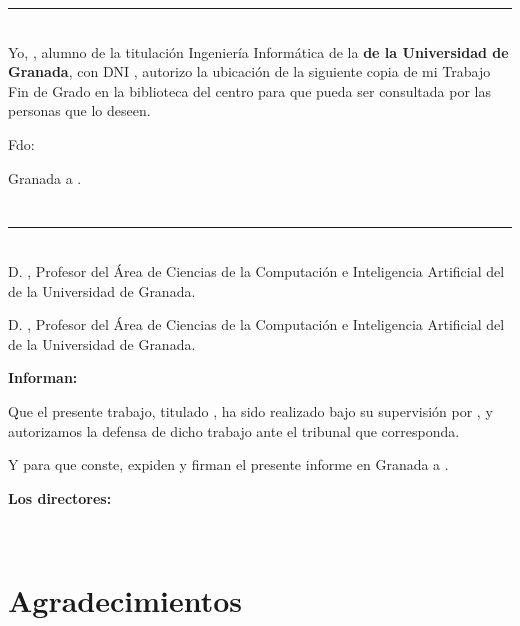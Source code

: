 \noindent\rule[-1ex]{\textwidth}{2pt}\\[4.5ex]

Yo, \textbf{\myName}, alumno de la titulación Ingeniería Informática de la \textbf{\myFaculty de la Universidad de Granada}, con DNI \myDNI, autorizo la
ubicación de la siguiente copia de mi Trabajo Fin de Grado en la biblioteca del centro para que pueda ser
consultada por las personas que lo deseen.

\vspace{6cm}

\noindent Fdo: \myName

\vspace{2cm}

\begin{flushright}
Granada a \myTime .
\end{flushright}


\chapter*{}
\thispagestyle{empty}

\noindent\rule[-1ex]{\textwidth}{2pt}\\[4.5ex]

D. \textbf{\myProf}, Profesor del Área de Ciencias de la Computación e Inteligencia Artificial del \myDepartment de la Universidad de Granada.

\vspace{0.5cm}

D. \textbf{\myOtherProf}, Profesor del Área de Ciencias de la Computación e Inteligencia Artificial del \myDepartment de la Universidad de Granada.


\vspace{0.5cm}

\textbf{Informan:}

\vspace{0.5cm}

Que el presente trabajo, titulado \textit{\textbf{\myTitle}},
ha sido realizado bajo su supervisión por \textbf{\myName}, y autorizamos la defensa de dicho trabajo ante el tribunal
que corresponda.

\vspace{0.5cm}

Y para que conste, expiden y firman el presente informe en Granada a \myTime .

\vspace{1cm}

\textbf{Los directores:}

\vspace{3cm} %

\noindent \textbf{\myProf \ \ \ \ \ \myOtherProf}

\chapter*{Agradecimientos}
\thispagestyle{empty}

      \vspace{1cm}




